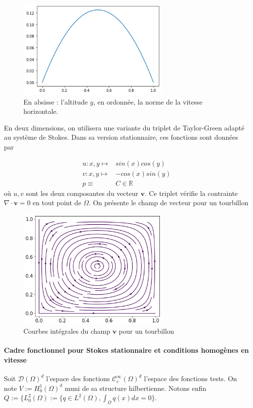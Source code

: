 \begin{figure}[htp]
    \centering
    \includegraphics[width=7.5cm]{Images/stokes/solutions/poiseuillePlan.png}
    \caption{En absisse : l'altitude $y$, en ordonnée, la norme de la vitesse horizontale.}
\end{figure}

En deux dimensions, on utilisera une variante du triplet de Taylor-Green adapté au système de Stokes. Dans sa version stationnaire, ces fonctions sont données par

\begin{align*}
    u : x, y \mapsto & sin(x) cos(y) \\
    v : x, y \mapsto & -cos(x) sin(y) \\
    p \equiv &  C \in \mathbb{R}
\end{align*}
où $u,v$ sont les deux composantes du vecteur $\mathbf{v}$. Ce triplet vérifie la contrainte $\nabla \cdot \mathbf{v} = 0$ en tout point de $\Omega$. On présente le champ de vecteur pour un tourbillon

\begin{figure}[htp]
    \centering
    \includegraphics[width=7.5cm]{Images/stokes/solutions/taylorGreenStream.png}
    \caption{Courbes intégrales du champ $\mathbf{v}$ pour un tourbillon}
\end{figure}

\paragraph{Cadre fonctionnel pour Stokes stationnaire et conditions homogènes en vitesse} Soit $\mathcal{D}(\Omega)^d$ l'espace des fonctions $\mathcal{C}^{\infty}_c(\Omega)^d$ l'espace des fonctions tests. On note $V := H^1_0(\Omega)^d$ muni de sa structure hilbertienne. Notons enfin $Q := \{ L^2_0(\Omega) := \{ q \in L^2(\Omega), \int_\Omega q(x) dx = 0 \}$.


